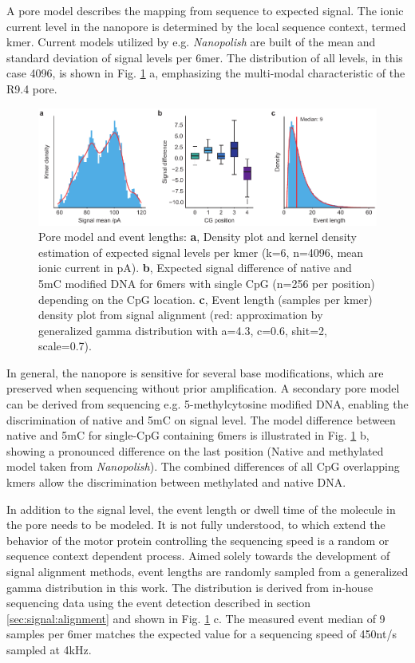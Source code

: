A pore model describes the mapping from sequence to expected signal. The ionic current level in the nanopore is determined by the local sequence context, termed kmer. Current models utilized by e.g. \textit{Nanopolish} are built of the mean and standard deviation of signal levels per 6mer. The distribution of all levels, in this case 4096, is shown in Fig. \ref{fig:signal:pm} a, emphasizing the multi-modal characteristic of the R9.4 pore.

\begin{figure}[h]
	\centering
	\includegraphics[width=1.0\textwidth]{figures/signal/pm.pdf}
	\captionsetup{format=plain}
	\caption[Pore model and event length]{Pore model and event lengths: \textbf{a}, Density plot and kernel density estimation of expected signal levels per kmer (k=6, n=4096, mean ionic current in pA). \textbf{b}, Expected signal difference of native and 5mC modified DNA for 6mers with single CpG (n=256 per position) depending on the CpG location. \textbf{c}, Event length (samples per kmer) density plot from signal alignment (red: approximation by generalized gamma distribution with a=4.3, c=0.6, shit=2, scale=0.7).}
	\label{fig:signal:pm}
\end{figure}

In general, the nanopore is sensitive for several base modifications, which are preserved when sequencing without prior amplification. A secondary pore model can be derived from sequencing e.g. 5-methylcytosine modified DNA, enabling the discrimination of native and 5mC on signal level. The model difference between native and 5mC for single-CpG containing 6mers is illustrated in Fig. \ref{fig:signal:pm} b, showing a pronounced difference on the last position (Native and methylated model taken from \textit{Nanopolish}). The combined differences of all CpG overlapping kmers allow the discrimination between methylated and native DNA.

In addition to the signal level, the event length or dwell time of the molecule in the pore needs to be modeled. It is not fully understood, to which extend the behavior of the motor protein controlling the sequencing speed is a random or sequence context dependent process. Aimed solely towards the development of signal alignment methods, event lengths are randomly sampled from a generalized gamma distribution in this work. 
The distribution is derived from in-house sequencing data using the event detection described in section \ref{sec:signal:alignment} and shown in Fig. \ref{fig:signal:pm} c. The measured event median of 9 samples per 6mer matches the expected value for a sequencing speed of 450nt/s sampled at 4kHz.

